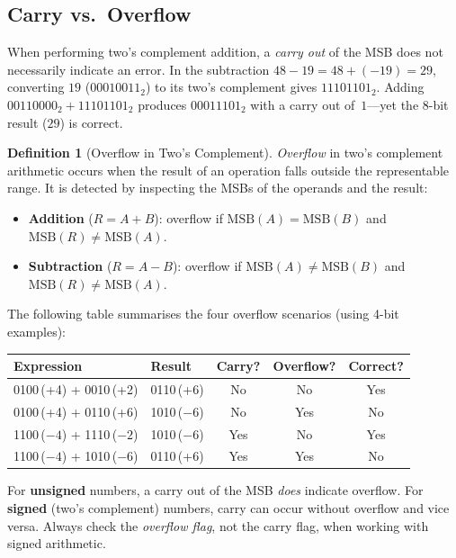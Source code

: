 \documentclass[11pt, a4paper, notitlepage]{report}
\theoremstyle{definition}
\newtheorem{definition}[theorem]{Definition}
\theoremstyle{remark}
\theoremstyle{definition}
\begin{document}
\subsection{Carry vs.\ Overflow}
\label{sec:carry-overflow}

When performing two's complement addition, a \emph{carry out} of the MSB does not necessarily indicate an error. In the subtraction $48 - 19 = 48 + (-19) = 29$, converting $19$ ($00010011_2$) to its two's complement gives $11101101_2$. Adding $00110000_2 + 11101101_2$ produces $00011101_2$ with a carry out of~$1$---yet the 8-bit result ($29$) is correct.

\begin{definition}[Overflow in Two's Complement]
  \label{def:overflow-tc}
  \emph{Overflow} in two's complement arithmetic occurs when the result of an operation falls outside the representable range. It is detected by inspecting the MSBs of the operands and the result:
  \begin{itemize}
    \item \textbf{Addition} ($R = A + B$): overflow if $\mathrm{MSB}(A) = \mathrm{MSB}(B)$ and $\mathrm{MSB}(R) \neq \mathrm{MSB}(A)$.
    \item \textbf{Subtraction} ($R = A - B$): overflow if $\mathrm{MSB}(A) \neq \mathrm{MSB}(B)$ and $\mathrm{MSB}(R) \neq \mathrm{MSB}(A)$.
  \end{itemize}
\end{definition}

The following table summarises the four overflow scenarios (using 4-bit examples):

\medskip
{\small
\begin{tabularx}{0.95\linewidth}{>{\ttfamily\small}l l c c c}
  \toprule
  \textrm{Expression} & Result & Carry? & Overflow? & Correct? \\
  \midrule
  0100\,(+4) + 0010\,(+2) & 0110\,(+6) & No & No & Yes \\
  0100\,(+4) + 0110\,(+6) & 1010\,($-6$) & No & Yes & No \\
  1100\,($-4$) + 1110\,($-2$) & 1010\,($-6$) & Yes & No & Yes \\
  1100\,($-4$) + 1010\,($-6$) & 0110\,(+6) & Yes & Yes & No \\
  \bottomrule
\end{tabularx}
}%
\medskip

\begin{warning}[title={Common Misconception: Carry Means Overflow}]
  For \textbf{unsigned} numbers, a carry out of the MSB \emph{does} indicate overflow. For \textbf{signed} (two's complement) numbers, carry can occur without overflow and vice versa. Always check the \emph{overflow flag}, not the carry flag, when working with signed arithmetic.
\end{warning}
\end{document}
